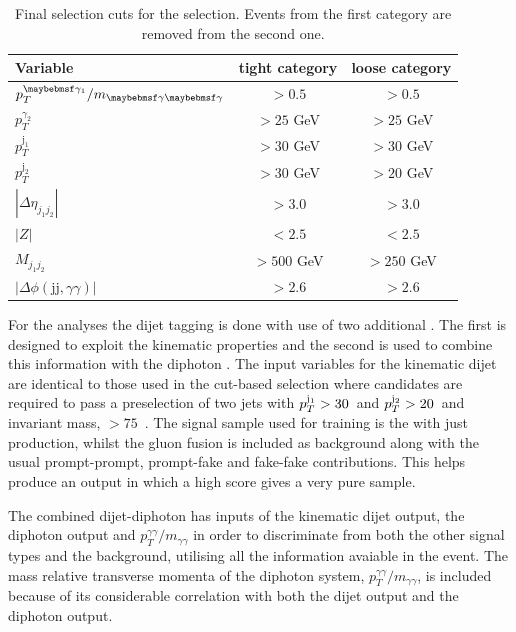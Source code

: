 \begin{table}
\centering
\begin{tabular}{ l  c  c }
Variable  &  tight category & loose category \\
\hline
 $  p_{T}^{\gamma_{1}}/\mgg $  & $>0.5$ & $>0.5$ \\
 $  p_{T}^{\gamma_{2}} $       & $>25$ GeV     & $>25$ GeV     \\
 $  p_{T}^{\mathrm{j}_{1}} $   & $>30$ GeV     & $>30$ GeV     \\
 $  p_{T}^{\mathrm{j}_{2}} $   & $>30$ GeV     & $>20$ GeV     \\
 $  |\Delta\eta_{j_{1}j_{2}}| $& $ >3.0$       & $ >3.0$       \\
 $  |Z|$                       & $ <2.5$       & $ <2.5$       \\
 $  M_{j_{1}j_{2}}$            & $ >500$ GeV   & $ >250$ GeV   \\
 $  |\Delta\phi(\mathrm{jj},\gamma\gamma)|$   & $>2.6$ & $>2.6$ \\
\end{tabular}
\caption{Final selection cuts for the \VBF selection. Events from the first category are
  removed from the second one.}
\label{tab:cic_vbf_cuts}
\end{table}

For the \MVA analyses the dijet tagging is done with use of two additional \MVAs. The first is designed to exploit the \VBF kinematic properties and the second is used to combine this information with the diphoton \BDT. The input variables for the kinematic dijet \BDT are identical to those used in the cut-based \VBF selection where candidates are required to pass a \VBF preselection of two jets with $p_{T}^{\mathrm{j}_{1}}>30$~\GeV and $p_{T}^{\mathrm{j}_{2}}>20$~\GeV and invariant mass, \mjj$>75$~\GeV. The signal sample used for training is the \SM \MC with just \VBF production, whilst the \SM gluon fusion \MC is included as background along with the usual prompt-prompt, prompt-fake and fake-fake contributions. This helps produce an output in which a high score gives a very pure \VBF sample.

The combined dijet-diphoton \BDT has inputs of the kinematic dijet \BDT output, the diphoton \BDT output and $p_{T}^{\gamma\gamma}/m_{\gamma\gamma}$ in order to discriminate \VBF from both the other signal types and the background, utilising all the information avaiable in the event. The mass relative transverse momenta of the diphoton system, $p_{T}^{\gamma\gamma}/m_{\gamma\gamma}$, is included because of its considerable correlation with both the dijet \BDT output and the diphoton \BDT output.

